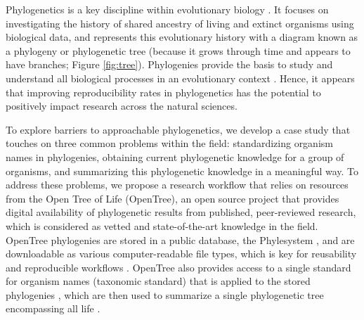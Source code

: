 \documentclass[12pt]{article}
\begin{document}
Phylogenetics is a key discipline within evolutionary biology \citep{dobzhansky1973nothing}.
It focuses on investigating the history of shared ancestry of living and extinct
organisms using biological data,
and represents this evolutionary history with a diagram known as a phylogeny
or phylogenetic tree (because it grows through time and appears to have branches;
Figure \ref{fig:tree}).
Phylogenies provide the basis to study and understand all biological processes
in an evolutionary context \citep{dobzhansky1973nothing}.
Hence, it appears that improving reproducibility rates in phylogenetics has the
potential to positively impact research across the natural sciences.

To explore barriers to approachable phylogenetics, we develop a case study
that touches on three common problems within the field: standardizing
organism names in phylogenies, obtaining current phylogenetic knowledge for a group of organisms,
and summarizing this phylogenetic knowledge in a meaningful way.
To address these problems, we propose a research workflow that relies on resources from the Open
Tree of Life (OpenTree), an open source project that provides
digital availability of phylogenetic results from published, peer-reviewed research, which
is considered as vetted and state-of-the-art knowledge in the field.
OpenTree phylogenies are stored in a public database, the Phylesystem \citep{mctavish2015phylesystem},
and are downloadable as various computer-readable file types, which is key for reusability
and reproducible workflows \citep{wilson2017good}.
OpenTree also provides access to a single standard for organism names (taxonomic standard)
that is applied to the stored phylogenies \citep{rees2017automated}, which are
then used to summarize a single phylogenetic tree encompassing all life \citep{opentreeoflife2019synth}.
\end{document}
